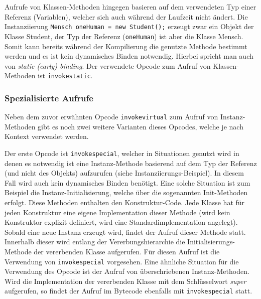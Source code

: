 \documentclass[conference]{IEEEtran}
\begin{document}
Aufrufe von Klassen-Methoden hingegen basieren auf dem verwendeten Typ einer Referenz (Variablen), welcher sich auch während der Laufzeit nicht ändert. Die Instanziierung \verb|Mensch oneHuman = new Student();| erzeugt zwar ein Objekt der Klasse Student, der Typ der Referenz (\verb|oneHuman|) ist aber die Klasse Mensch. Somit kann bereits während der Kompilierung die genutzte Methode bestimmt werden und es ist kein dynamisches Binden notwendig. Hierbei spricht man auch von \textit{static (early) binding}. Der verwendete Opcode zum Aufruf von Klassen-Methoden ist \verb|invokestatic|. \cite{Venners.1997}

\subsubsection{Spezialisierte Aufrufe}
Neben dem zuvor erwähnten Opcode \verb|invokevirtual| zum Aufruf von Instanz-Methoden gibt es noch zwei weitere Varianten dieses Opcodes, welche je nach Kontext verwendet werden. 

Der erste Opcode ist \verb|invokespecial|, welcher in Situationen genutzt wird in denen es notwendig ist eine Instanz-Methode basierend auf dem Typ der Referenz (und nicht des Objekts) aufzurufen (siehe Instanziierungs-Beispiel). In diesem Fall wird auch kein dynamisches Binden benötigt. Eine solche Situation ist zum Beispiel die Instanz-Initialisierung, welche über die sogenannten Init-Methoden erfolgt. Diese Methoden enthalten den Konstruktur-Code. Jede Klasse hat für jeden Konstruktur eine eigene Implementation dieser Methode (wird kein Konstruktor explizit definiert, wird eine Standardimplementation angelegt). Sobald eine neue Instanz erzeugt wird, findet der Aufruf dieser Methode statt. Innerhalb dieser wird entlang der Vererbungshierarchie die Initialisierungs-Methode der vererbenden Klasse aufgerufen. Für diesen Aufruf ist die Verwendung von \verb|invokespecial| vorgesehen. Eine ähnliche Situation für die Verwendung des Opcode ist der Aufruf von überschriebenen Instanz-Methoden. Wird die Implementation der vererbenden Klasse mit dem Schlüsselwort \textit{super} aufgerufen, so findet der Aufruf im Bytecode ebenfalls mit \verb|invokespecial| statt.
\end{document}
